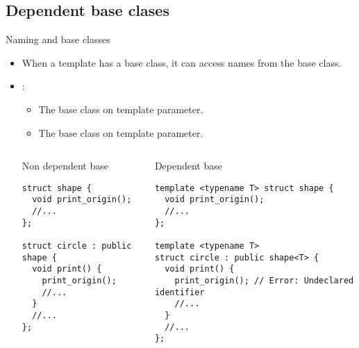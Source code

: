 \subsection{Dependent base clases}

\begin{frame}[t,fragile]{Naming and base classes}
\begin{itemize}
  \item When a template has a base class, it can access names from the base class.

  \item {}:
    \begin{itemize}
      \item The base class  on template parameter.
      \item The base class  on template parameter.
    \end{itemize}

\pause
\begin{columns}[T]

\begin{block}{Non dependent base}
\begin{lstlisting}[basicstyle=\mode<presentation>{\tiny}]
struct shape {
  void print_origin();
  //...
};

struct circle : public shape {
  void print() {
    print_origin();
    //...
  }
  //...
};
\end{lstlisting}
\end{block}

\begin{block}{Dependent base}
\begin{lstlisting}[basicstyle=\mode<presentation>{\tiny}]
template <typename T> struct shape {
  void print_origin();
  //...
};

template <typename T> 
struct circle : public shape<T> {
  void print() {
    print_origin(); // Error: Undeclared identifier
    //...
  }
  //...
};
\end{lstlisting}
\end{block}

\end{columns}

\end{itemize}
\end{frame}

